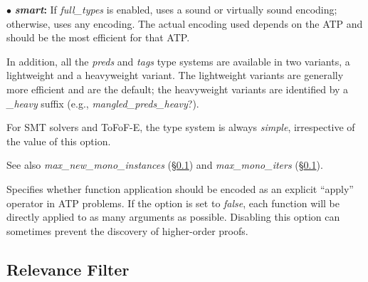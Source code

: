 \documentclass[a4paper,12pt]{article}
\begin{document}
\begin{enum}
\begin{enum}
\item[$\bullet$] \textbf{\textit{smart}:} If \textit{full\_types} is enabled,
uses a sound or virtually sound encoding; otherwise, uses any encoding. The actual
encoding used depends on the ATP and should be the most efficient for that ATP.
\end{enum}

In addition, all the \textit{preds} and \textit{tags} type systems are available
in two variants, a lightweight and a heavyweight variant. The lightweight
variants are generally more efficient and are the default; the heavyweight
variants are identified by a \textit{\_heavy} suffix (e.g.,
\textit{mangled\_preds\_heavy}{?}).

For SMT solvers and ToFoF-E, the type system is always \textit{simple},
irrespective of the value of this option.

\nopagebreak
{\small See also \textit{max\_new\_mono\_instances} (\S\ref{relevance-filter})
and \textit{max\_mono\_iters} (\S\ref{relevance-filter}).}

Specifies whether function application should be encoded as an explicit
``apply'' operator in ATP problems. If the option is set to \textit{false}, each
function will be directly applied to as many arguments as possible. Disabling
this option can sometimes prevent the discovery of higher-order proofs.
\end{enum}

\subsection{Relevance Filter}
\label{relevance-filter}
\end{document}
